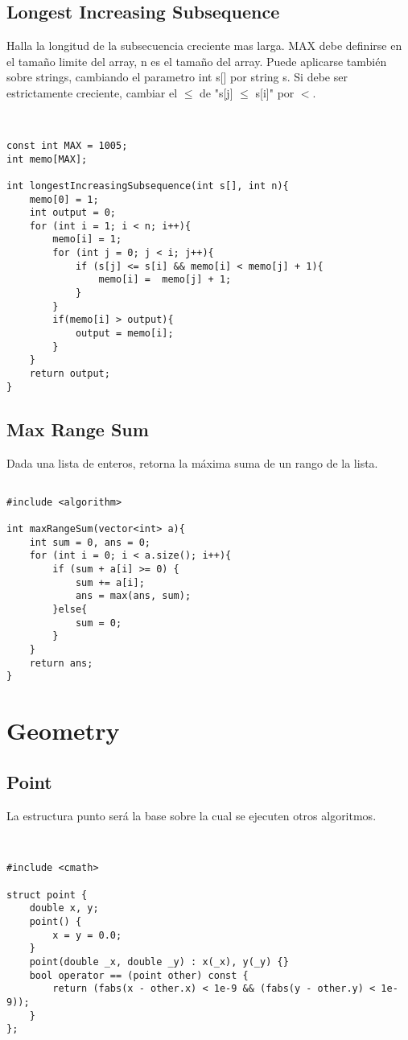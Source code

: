 \documentclass[11pt,letterpaper,twocolumn,twosided]{article}
\begin{document}
\subsection{Longest Increasing Subsequence}
Halla la longitud de la subsecuencia creciente mas larga. MAX debe definirse en el tamaño  limite del array, n es el tamaño del array. Puede aplicarse tambi\'en sobre strings, cambiando el parametro int s[] por string s. Si debe ser estrictamente creciente, cambiar el $\leq $ de "s[j] $\leq $ s[i]" por $<$.

\begin{lstlisting}


const int MAX = 1005;
int memo[MAX];

int longestIncreasingSubsequence(int s[], int n){
	memo[0] = 1;
	int output = 0;
	for (int i = 1; i < n; i++){
		memo[i] = 1;
		for (int j = 0; j < i; j++){
			if (s[j] <= s[i] && memo[i] < memo[j] + 1){
				memo[i] =  memo[j] + 1;
			} 
		}
		if(memo[i] > output){
			output = memo[i];
		}
	}
	return output;
}
\end{lstlisting}

\subsection{Max Range Sum}
Dada una lista de enteros, retorna la m\'axima suma de un rango de la lista.

\begin{lstlisting}

#include <algorithm>

int maxRangeSum(vector<int> a){
	int sum = 0, ans = 0;
	for (int i = 0; i < a.size(); i++){
		if (sum + a[i] >= 0) {  
			sum += a[i];
		    ans = max(ans, sum);          
	    }else{
	    	sum = 0;
	    }
	}
	return ans;
}
\end{lstlisting}

\section{Geometry}

\subsection{Point}
La estructura punto ser\'a la base sobre la cual se ejecuten otros algoritmos. 
\begin{lstlisting}


#include <cmath>

struct point { 
	double x, y;
  	point() { 
  		x = y = 0.0; 
  	}
  	point(double _x, double _y) : x(_x), y(_y) {}        
  	bool operator == (point other) const {
   		return (fabs(x - other.x) < 1e-9 && (fabs(y - other.y) < 1e-9)); 
   	}
};

\end{lstlisting}
\end{document}
